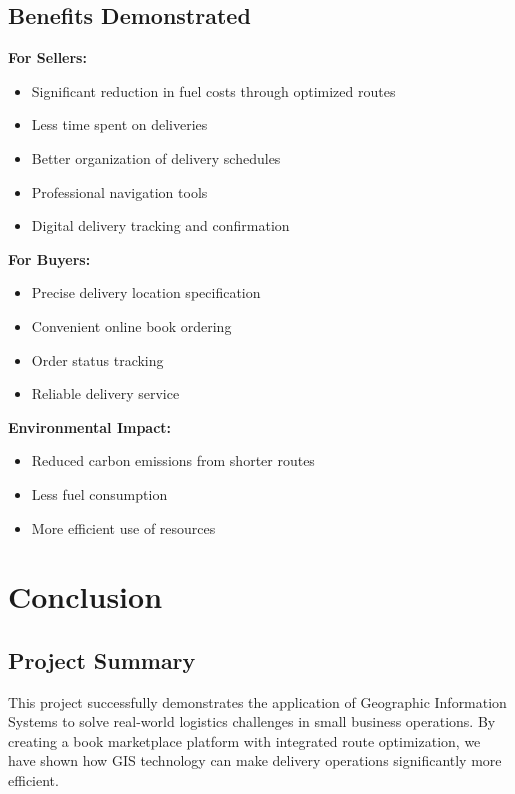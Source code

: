 \documentclass[12pt,a4paper]{article}
\begin{document}
\subsection{Benefits Demonstrated}

\textbf{For Sellers:}
\begin{itemize}
    \item Significant reduction in fuel costs through optimized routes
    \item Less time spent on deliveries
    \item Better organization of delivery schedules
    \item Professional navigation tools
    \item Digital delivery tracking and confirmation
\end{itemize}

\textbf{For Buyers:}
\begin{itemize}
    \item Precise delivery location specification
    \item Convenient online book ordering
    \item Order status tracking
    \item Reliable delivery service
\end{itemize}

\textbf{Environmental Impact:}
\begin{itemize}
    \item Reduced carbon emissions from shorter routes
    \item Less fuel consumption
    \item More efficient use of resources
\end{itemize}

\newpage

\section{Conclusion}

\subsection{Project Summary}

This project successfully demonstrates the application of Geographic Information Systems to solve real-world logistics challenges in small business operations. By creating a book marketplace platform with integrated route optimization, we have shown how GIS technology can make delivery operations significantly more efficient.
\end{document}
